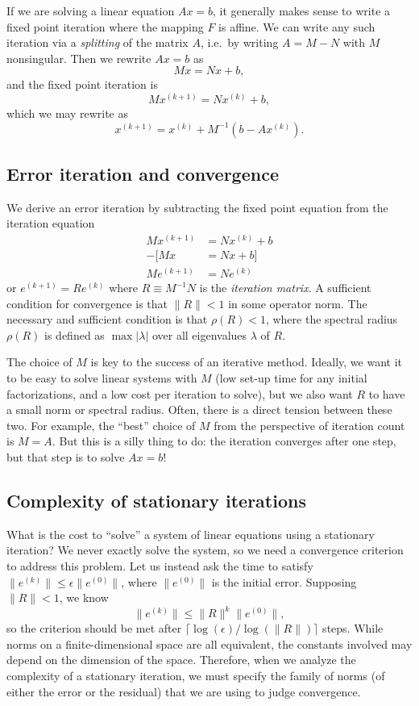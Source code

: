 \documentclass[12pt, leqno]{article} %
\begin{document}
If we are solving a linear equation $Ax = b$, it generally makes sense
to write a fixed point iteration where the mapping $F$ is affine.  We
can write any such iteration via a {\em splitting} of the matrix $A$,
i.e.~by writing $A=M-N$ with $M$ nonsingular.  Then we rewrite $Ax = b$
as
\[
  Mx = Nx + b,
\]
and the fixed point iteration is
\[
  Mx^{(k+1)} = Nx^{(k)} + b,
\]
which we may rewrite as
\[
  x^{(k+1)} = x^{(k)} + M^{-1} (b-Ax^{(k)}).
\]

\subsection{Error iteration and convergence}

We derive an error iteration by subtracting the fixed point equation
from the iteration equation
\begin{align*}
  M x^{(k+1)} &= Nx^{(k)} + b \\
  -[M x &= Nx + b] \\ \hline
  Me^{(k+1)} &= N e^{(k)}
\end{align*}
or $e^{(k+1)} = R e^{(k)}$ where $R \equiv M^{-1} N$ is
the {\em iteration matrix}.  A sufficient condition for convergence
is that $\|R\| < 1$ in some operator norm.  The necessary and sufficient
condition is that $\rho(R) < 1$, where the spectral radius $\rho(R)$
is defined as $\max |\lambda|$ over all eigenvalues $\lambda$ of $R$.

The choice of $M$ is key to the success of an iterative method.
Ideally, we want it to be easy to solve linear systems with $M$
(low set-up time for any initial factorizations, and a low cost
per iteration to solve), but we also want $R$ to have a small
norm or spectral radius.  Often, there is a direct tension between
these two.  For example, the ``best'' choice of $M$ from the perspective
of iteration count is $M = A$.  But this is a silly thing to do:
the iteration converges after one step, but that step is to solve
$Ax = b$!

\subsection{Complexity of stationary iterations}

What is the cost to ``solve'' a system of linear equations using a
stationary iteration?  We never exactly solve the system, so we need
a convergence criterion to address this problem.  Let us instead ask
the time to satisfy $\|e^{(k)}\| \leq \epsilon \|e^{(0)}\|$, where
$\|e^{(0)}\|$ is the initial error.  Supposing $\|R\| < 1$, we know
\[
  \|e^{(k)}\| \leq \|R\|^k \|e^{(0)}\|,
\]
so the criterion should be met
after $\lceil \log(\epsilon)/\log(\|R\|) \rceil$
steps.
While norms on a finite-dimensional space are all equivalent,
the constants involved may depend on the dimension of the space.
Therefore, when we analyze the complexity of a stationary iteration,
we must specify the family of norms (of either the error or the residual)
that we are using to judge convergence.
\end{document}
